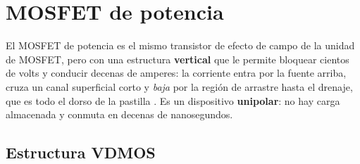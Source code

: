 \section{MOSFET de potencia}
\label{sec:mosfet}

El MOSFET de potencia es el mismo transistor de efecto de campo de la unidad de MOSFET, pero con
una estructura \textbf{vertical} que le permite bloquear cientos de volts y conducir decenas de
amperes: la corriente entra por la fuente arriba, cruza un canal superficial corto y \emph{baja}
por la región de arrastre hasta el drenaje, que es todo el dorso de la pastilla . Es un
dispositivo \textbf{unipolar}: no hay carga almacenada y conmuta en decenas de nanosegundos.

\subsection{Estructura VDMOS}

